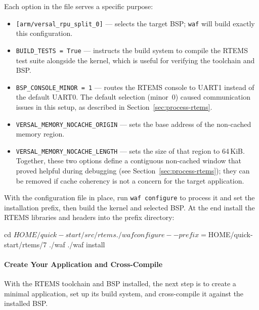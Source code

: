 \documentclass[
	a4paper,
]{CSMakotoTechnicalReport}
\begin{document}

Each option in the file serves a specific purpose:

\begin{itemize}
    \item \texttt{[arm/versal\_rpu\_split\_0]} --- selects the target BSP; \texttt{waf} will build exactly this configuration.
    \item \texttt{BUILD\_TESTS = True} --- instructs the build system to compile the RTEMS test suite alongside the kernel, which is useful for verifying the toolchain and BSP.
    \item \texttt{BSP\_CONSOLE\_MINOR = 1} --- routes the RTEMS console to UART1 instead of the default UART0.
    The default selection (minor~0) caused communication issues in this setup, as described in Section~\ref{sec:process-rtems}.
    \item \texttt{VERSAL\_MEMORY\_NOCACHE\_ORIGIN} --- sets the base address of the non-cached memory region.
    \item \texttt{VERSAL\_MEMORY\_NOCACHE\_LENGTH} --- sets the size of that region to 64\,KiB.
    Together, these two options define a contiguous non-cached window that proved helpful during debugging (see Section~\ref{sec:process-rtems}); they can be removed if cache coherency is not a concern for the target application.
\end{itemize}

With the configuration file in place, run \texttt{waf configure} to process it and set the installation prefix, then build the kernel and selected BSP. At the end install the RTEMS libraries and headers into the prefix directory:

\begin{bashcode}
cd $HOME/quick-start/src/rtems
./waf configure --prefix=$HOME/quick-start/rtems/7
./waf
./waf install
\end{bashcode}

\paragraph*{Create Your Application and Cross-Compile}

With the RTEMS toolchain and BSP installed, the next step is to create a minimal application, set up its build system, and cross-compile it against the installed BSP.
\end{document}
